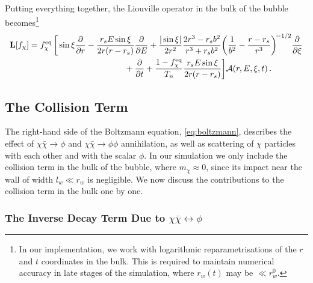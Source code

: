 \documentclass[
onecolumn, %
11pt, %
tightenlines,
superscriptaddress, %
nofootinbib, %
preprintnumbers, %
prd %
]{revtex4-1}
\newcommand{\pd}[2]{\frac{\partial #1}{\partial #2}}                  %
\newcommand{\ba}[1]{\bigg(#1\bigg)}                                   %
\newcommand{\f}{\ensuremath{f_\chi}\xspace}
\newcommand{\A}{\ensuremath{\mathcal A}\xspace}
\newcommand{\feq}{\ensuremath{\f^\text{eq}}\xspace}
\begin{document}
Putting everything together, the Liouville operator in the bulk of the bubble becomes\footnote{In our implementation, we work with logarithmic reparametrisations of the $r$ and $t$ coordinates in the bulk. This is required to maintain numerical accuracy in late stages of the simulation, where $r_w(t)$ may be $\ll r_w^0$.}
%
\begin{align}
	\boldsymbol{\mathrm L}[\f] &= \feq \, \bigg[
	    \sin \xi \pd{}{r}
	  - \frac{r_s E \sin\xi}{2r(r-r_s)}  \pd{}{E}
	  + \frac{|\sin\xi|}{2r^2}\frac{2r^3-r_s b^2}{r^3+r_s b^2}
	    \ba{\frac{1}{b^2} - \frac{r-r_s}{r^3}}^{\!-1/2} \pd{}{\xi}
	                                                        \nonumber\\
	&\hspace{4 cm}
	  + \pd{}{t} +\frac{1-\feq}{T_n}\frac{r_s E \sin\xi}{2r(r-r_s)}\bigg]
	\A(r,E,\xi, t) \,.
	\label{eq:liouville-bulk}
\end{align}


\subsection{The Collision Term}
\label{sec:collision}

The right-hand side of the Boltzmann equation, \cref{eq:boltzmann}, describes the effect of $\chi \bar\chi \to \phi$ and $\chi \bar\chi \to \phi\phi$ annihilation, as well as scattering of $\chi$ particles with each other and with the scalar $\phi$. In our simulation we only include the collision term in the bulk of the bubble, where $m_\chi\approx 0$, since its impact near the wall of width $l_w\ll r_w$ is negligible. We now discuss the contributions to the collision term in the bulk one by one.


\subsubsection{The Inverse Decay Term Due to $\chi\bar\chi \leftrightarrow \phi$}
\end{document}
